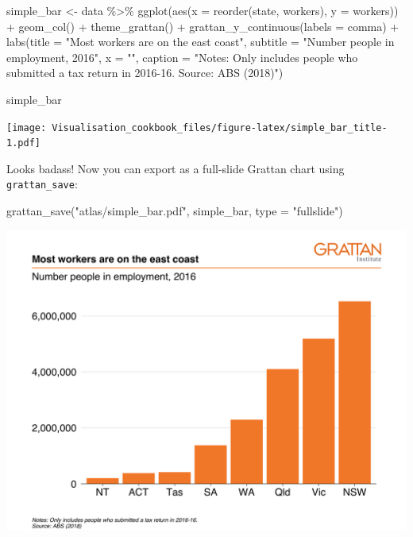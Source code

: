 \documentclass[
]{book}
\newenvironment{Shaded}{\begin{snugshade}}{\end{snugshade}}
\newcommand{\AttributeTok}[1]{\textcolor[rgb]{0.77,0.63,0.00}{#1}}
\newcommand{\FunctionTok}[1]{\textcolor[rgb]{0.00,0.00,0.00}{#1}}
\newcommand{\NormalTok}[1]{#1}
\newcommand{\OtherTok}[1]{\textcolor[rgb]{0.56,0.35,0.01}{#1}}
\newcommand{\SpecialCharTok}[1]{\textcolor[rgb]{0.00,0.00,0.00}{#1}}
\newcommand{\StringTok}[1]{\textcolor[rgb]{0.31,0.60,0.02}{#1}}
\begin{document}
\begin{Shaded}
\begin{Highlighting}[]
\NormalTok{simple\_bar }\OtherTok{\textless{}{-}}\NormalTok{ data }\SpecialCharTok{\%\textgreater{}\%} 
  \FunctionTok{ggplot}\NormalTok{(}\FunctionTok{aes}\NormalTok{(}\AttributeTok{x =} \FunctionTok{reorder}\NormalTok{(state, workers),}
             \AttributeTok{y =}\NormalTok{ workers)) }\SpecialCharTok{+} 
  \FunctionTok{geom\_col}\NormalTok{() }\SpecialCharTok{+} 
  \FunctionTok{theme\_grattan}\NormalTok{() }\SpecialCharTok{+} 
  \FunctionTok{grattan\_y\_continuous}\NormalTok{(}\AttributeTok{labels =}\NormalTok{ comma) }\SpecialCharTok{+} 
  \FunctionTok{labs}\NormalTok{(}\AttributeTok{title =} \StringTok{"Most workers are on the east coast"}\NormalTok{,}
       \AttributeTok{subtitle =} \StringTok{"Number people in employment, 2016"}\NormalTok{,}
       \AttributeTok{x =} \StringTok{""}\NormalTok{,}
       \AttributeTok{caption =} \StringTok{"Notes: Only includes people who submitted a tax return in 2016{-}16. Source: ABS (2018)"}\NormalTok{)}

\NormalTok{simple\_bar}
\end{Highlighting}
\end{Shaded}

\texttt{[image: Visualisation\_cookbook\_files/figure-latex/simple\_bar\_title-1.pdf]}

Looks badass! Now you can export as a full-slide Grattan chart using \texttt{grattan\_save}:

\begin{Shaded}
\begin{Highlighting}[]
\FunctionTok{grattan\_save}\NormalTok{(}\StringTok{"atlas/simple\_bar.pdf"}\NormalTok{, simple\_bar, }\AttributeTok{type =} \StringTok{"fullslide"}\NormalTok{)}
\end{Highlighting}
\end{Shaded}

\includegraphics[width=44.44in]{atlas/simple_bar}
\end{document}
